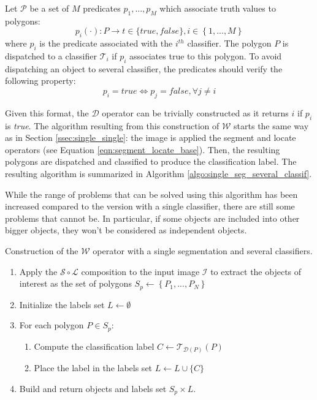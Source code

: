 \begin{definition} 
	Let $\mathcal{P}$ be a set of $M$ predicates $p_1, ..., p_M$ which associate truth values to polygons:
	\begin{equation}
		p_i(\cdot) : P \rightarrow t \in \{true, false\}, i \in \left\{1,...,M\right\} 
	\end{equation}
	where $p_i$ is the predicate associated with the $i^{th}$ classifier. The polygon $P$ is dispatched to a classifier $\mathcal{T}_i$ if $p_i$ associates true to this polygon. To avoid dispatching an object to several classifier, the predicates should verify the following property:
	\begin{equation}
		p_i = true \Leftrightarrow p_j = false, \forall j \neq i
	\end{equation} 
\end{definition}

Given this format, the $\mathcal{D}$ operator can be trivially constructed as it returns $i$ if $p_i$ is \textit{true}. The algorithm resulting from this construction of $\mathcal{W}$ starts the same way as in Section \ref{ssec:single_single}: the image is applied the segment and locate operators (see Equation \ref{eqn:segment_locate_base}). Then, the resulting polygons are dispatched and classified to produce the classification label. The resulting algorithm is summarized in Algorithm \ref{algo:single_seg_several_classif}. 

While the range of problems that can be solved using this algorithm has been increased compared to the version with a single classifier, there are still some problems that cannot be. In particular, if some objects are included into other bigger objects, they won't be considered as independent objects.

\begin{algorithm}\label{algo:single_seg_several_classif}
Construction of the $\mathcal{W}$ operator with a single segmentation and several classifiers. 
\begin{enumerate}
	\item Apply the $\mathcal{S} \circ \mathcal{L}$ composition to the input image $\mathcal{I}$ to extract the objects of interest as the set of polygons $S_p \leftarrow \left\{P_1, ..., P_N \right\}$
	\item Initialize the labels set $L \leftarrow \emptyset$
	\item For each polygon $P \in S_p$:
	\begin{enumerate}
		\item Compute the classification label $C \leftarrow \mathcal{T}_{\mathcal{D}(P)}(P)$
		\item Place the label in the labels set $L \leftarrow L \cup \{C\}$
	\end{enumerate}
	\item Build and return objects and labels set $S_p \times L$.
\end{enumerate}
\end{algorithm}

